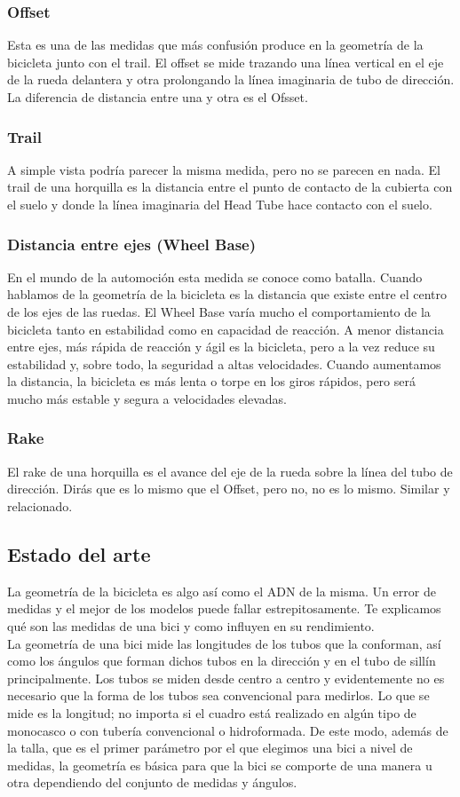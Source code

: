 \documentclass{article}
\begin{document}
\subsubsection{Offset}
Esta es una de las medidas que más confusión produce en la geometría de la bicicleta junto con el trail. El offset se mide trazando una línea vertical en el eje de la rueda delantera y otra prolongando la línea imaginaria de tubo de dirección. La diferencia de distancia entre una y otra es el Ofsset.
\subsubsection{Trail}
A simple vista podría parecer la misma medida, pero no se parecen en nada. El trail de una horquilla es la distancia entre el punto de contacto de la cubierta con el suelo y donde la línea imaginaria del Head Tube hace contacto con el suelo.
\subsubsection{Distancia entre ejes (Wheel Base)}
En el mundo de la automoción esta medida se conoce como batalla. Cuando hablamos de la geometría de la bicicleta es la distancia que existe entre el centro de los ejes de las ruedas. El Wheel Base varía mucho el comportamiento de la bicicleta tanto en estabilidad como en capacidad de reacción. A menor distancia entre ejes, más rápida de reacción y ágil es la bicicleta, pero a la vez reduce su estabilidad y, sobre todo, la seguridad a altas velocidades. Cuando aumentamos la distancia, la bicicleta es más lenta o torpe en los giros rápidos, pero será mucho más estable y segura a velocidades elevadas.
\subsubsection{Rake}
El rake de una horquilla es el avance del eje de la rueda sobre la línea del tubo de dirección. Dirás que es lo mismo que el Offset, pero no, no es lo mismo. Similar y relacionado.

\subsection{Estado del arte}
La geometría de la bicicleta es algo así como el ADN de la misma. Un error de medidas y el mejor de los modelos puede fallar estrepitosamente. Te explicamos qué son las medidas de una bici y como influyen en su rendimiento.\\
La geometría de una bici mide las longitudes de los tubos que la conforman, así como los ángulos que forman dichos tubos en la dirección y en el tubo de sillín principalmente. Los tubos se miden desde centro a centro y evidentemente no es necesario que la forma de los tubos sea convencional para medirlos. Lo que se mide es la longitud; no importa si el cuadro está realizado en algún tipo de monocasco o con tubería convencional o hidroformada. De este modo, además de la talla, que es el primer parámetro por el que elegimos una bici a nivel de medidas, la geometría es básica para que la bici se comporte de una manera u otra dependiendo del conjunto de medidas y ángulos.\\
\newpage
\end{document}
